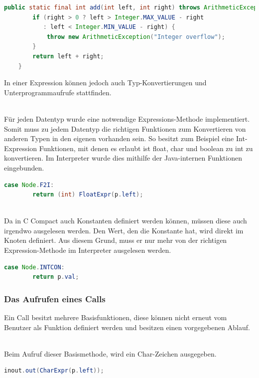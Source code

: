 \begin{lstlisting}[language=JAVA]
	public static final int add(int left, int right) throws ArithmeticException {
		if (right > 0 ? left > Integer.MAX_VALUE - right
           : left < Integer.MIN_VALUE - right) {
			throw new ArithmeticException("Integer overflow");
		}
		return left + right;
	}
\end{lstlisting}

In einer Expression können jedoch auch Typ-Konvertierungen und Unterprogrammaufrufe stattfinden.

\\
Für jeden Datentyp wurde eine notwendige Expressions-Methode implementiert. Somit muss zu jedem Datentyp die richtigen Funktionen zum Konvertieren von anderen Typen in den eigenen vorhanden sein. So besitzt zum Beispiel eine Int-Expression Funktionen, mit denen es erlaubt ist float, char und boolean zu int zu konvertieren.
Im Interpreter wurde dies mithilfe der Java-internen Funktionen eingebunden. 

\begin{lstlisting}[language=JAVA]
case Node.F2I:
		return (int) FloatExpr(p.left);
\end{lstlisting}


\\
Da in C Compact auch Konstanten definiert werden können, müssen diese auch irgendwo ausgelesen werden. Den Wert, den die Konstante hat, wird direkt im Knoten definiert. Aus diesem Grund, muss er nur mehr von der richtigen Expression-Methode im Interpreter ausgelesen werden.

\begin{lstlisting}[language=JAVA]
case Node.INTCON:
		return p.val;
\end{lstlisting}

\subsubsection{Das Aufrufen eines Calls}
Ein Call besitzt mehrere Basisfunktionen, diese können nicht erneut vom Benutzer als Funktion definiert werden und besitzen einen vorgegebenen Ablauf.

\\
Beim Aufruf dieser Basismethode, wird ein Char-Zeichen ausgegeben.
\begin{lstlisting}[language=JAVA]
inout.out(CharExpr(p.left));
\end{lstlisting}


